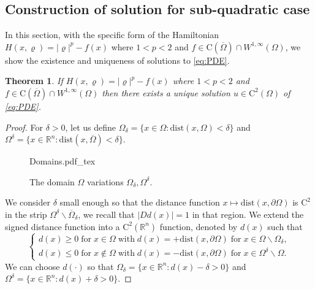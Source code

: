 \documentclass[11pt,reqno]{amsart}
\numberwithin{figure}{section}
\theoremstyle{plain}
\newtheorem{thm}{Theorem}[section]
\theoremstyle{remark}
\numberwithin{equation}{section}
\newcommand{\incfig}[1]{%
    \def\svgwidth{\columnwidth}
    {#1.pdf_tex}
}
\begin{document}
\begin{appendices}
\section{Construction of solution for sub-quadratic case}
In this section, with the specific form of the Hamiltonian $H(x,\varrho) = |\varrho|^p - f(x)$ where $1<p< 2$ and $f\in \mathrm{C}(\overline{\Omega})\cap W^{1,\infty}(\Omega)$, we show the existence and uniqueness of solutions to \eqref{eq:PDE}. 
\begin{thm} If $H(x,\varrho) = |\varrho|^p - f(x)$ where $1<p< 2$ and $f\in \mathrm{C}(\overline{\Omega})\cap W^{1,\infty}(\Omega)$ then there exists a unique solution $u\in \mathrm{C}^2(\Omega)$ of \eqref{eq:PDE}.
\end{thm}


\begin{proof} For $\delta>0$, let us define $\Omega_\delta = \{x\in \Omega: \mathrm{dist}(x,\Omega) < \delta\}$ and $\Omega^\delta = \{x\in \mathbb{R}^n: \mathrm{dist}(x,\overline{\Omega}) < \delta\}$. 
\begin{figure}[ht]
    \centering
    \def\svgwidth{0.5\columnwidth}
    {Domains.pdf_tex}
    \caption{The domain $\Omega$ variations $\Omega_\delta, \Omega^\delta$.}
    \label{fig:Domains}
\end{figure}
We consider $\delta$ small enough so that the distance function $x\mapsto \mathrm{dist}(x,\partial \Omega)$ is $\mathrm{C}^2$ in the strip $\Omega^\delta\backslash \overline{\Omega}_\delta$, we recall that $|D d(x)| = 1$ in that region. We extend the signed distance function into a $\mathrm{C}^2(\mathbb{R}^n)$ function, denoted by $d(x)$ such that 
\begin{equation*}
    \begin{cases}
    d(x)\geq 0\;\text{for}\;x\in\Omega\;\text{with}\;d(x) = +\mathrm{dist}(x,\partial\Omega)\;\text{for}\;x\in \Omega\backslash \Omega_\delta,\\
    d(x)\leq 0\;\text{for}\;x\notin \Omega\;\text{with}\;d(x) = -\mathrm{dist}(x,\partial\Omega)\;\text{for}\;x\in \Omega^\delta\backslash \Omega.
    \end{cases}
\end{equation*}
We can choose $d(\cdot)$ so that $\Omega_\delta = \{x\in \mathbb{R}^n: d(x)-\delta >0 \}$ and $\Omega^\delta = \{x\in \mathbb{R}^n: d(x) +\delta>0\}$.


\end{proof}
\end{appendices}
\end{document}
